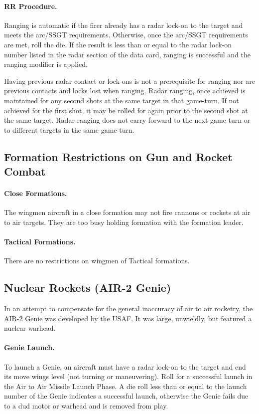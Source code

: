 \paragraph{RR Procedure.} Ranging is automatic if the firer already has a radar lock-on to the target and meets the arc/SSGT requirements. Otherwise, once the arc/SSGT requirements are met, roll the die. If the result is less than or equal to the radar lock-on number listed in the radar section of the data card, ranging is successful and the ranging modifier is applied.

Having previous radar contact or lock-ons is not a prerequisite for ranging nor are previous contacts and locks lost when ranging. Radar ranging, once achieved is maintained for any second shots at the same target in that game-turn. If not achieved for the first shot, it may be rolled for again prior to the second shot at the same target. Radar ranging does not carry forward to the next game turn or to different targets in the same game turn.

\subsection{Formation Restrictions on Gun and Rocket Combat}

\paragraph{Close Formations.} The wingmen aircraft in a close formation may not fire cannons or rockets at air to air targets. They are too busy holding formation with the formation leader.

\paragraph{Tactical Formations.} There are no restrictions on wingmen of Tactical formations.

\subsection{Nuclear Rockets (AIR-2 Genie)}

In an attempt to compensate for the general inaccuracy of air to air rocketry, the AIR-2 Genie was developed by the USAF. It was large, unwieldly, but featured a nuclear warhead.

\paragraph{Genie Launch.} To launch a Genie, an aircraft must have a radar lock-on to the target and end its move wings level (not turning or maneuvering). Roll for a successful launch in the Air to Air Missile Launch Phase. A die roll less than or equal to the launch number of the Genie indicates a successful launch, otherwise the Genie fails due to a dud motor or warhead and is removed from play.

